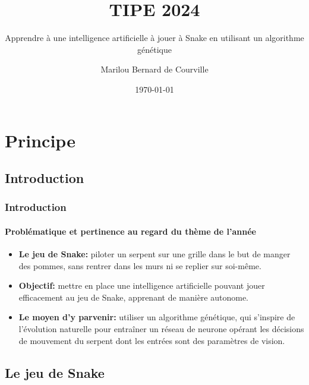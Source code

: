 \documentclass[10pt]{beamer}
\title{TIPE 2024}
\subtitle{Apprendre à une intelligence artificielle à jouer à Snake en utilisant un algorithme génétique}
\author{Marilou Bernard de Courville}
\institute{Lycée Charlemagne}
\date{\today}
\begin{document}
\begin{frame}
    \titlepage
\end{frame}


\section{Principe}

\subsection{Introduction}

\begin{frame}
\frametitle{Introduction}
\framesubtitle{Problématique et pertinence au regard du thème de l'année}
\begin{itemize}
\item \textbf{Le jeu de Snake:} piloter un serpent sur une grille dans le but de
manger des pommes, sans rentrer dans les murs ni se replier sur
soi-même.
\item \textbf{Objectif:} mettre en place une intelligence
artificielle pouvant jouer efficacement au jeu de Snake, apprenant de manière autonome.
\item \textbf{Le moyen d'y parvenir:} utiliser un algorithme génétique,
qui s'inspire de l'évolution naturelle pour entraîner un réseau de neurone opérant les décisions de mouvement
du serpent dont les entrées sont des paramètres de vision.
\end{itemize}
\end{frame}

\subsection{Le jeu de Snake}
\end{document}
